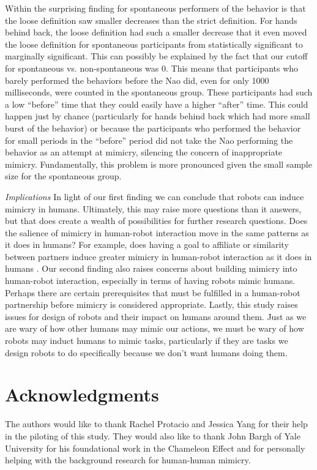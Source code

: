 \documentclass{acm_proc_article-sp}
\begin{document}
Within the surprising finding for spontaneous performers of the behavior is that the loose definition saw smaller decreases than the strict definition. For hands behind back, the loose definition had such a smaller decrease that it even moved the loose definition for spontaneous participants from statistically significant to marginally significant. This can possibly be explained by the fact that our cutoff for spontaneous vs. non-spontaneous was 0. This means that participants who barely performed the behaviors before the Nao did, even for only 1000 milliseconds, were counted in the spontaneous group. These participants had such a low ``before'' time that they could easily have a higher ``after'' time. This could happen just by chance (particularly for hands behind back which had more small burst of the behavior) or because the participants who performed the behavior for small periods in the ``before'' period did not take the Nao performing the behavior as an attempt at mimicry, silencing the concern of inappropriate mimicry. Fundamentally, this problem is more pronounced given the small sample size for the spontaneous group.

\textit{Implications}
In light of our first finding we can conclude that robots can induce mimicry in humans. Ultimately, this may raise more questions than it answers, but that does create a wealth of possibilities for further research questions. Does the salience of mimicry in human-robot interaction move in the same patterns as it does in humans? For example, does having a goal to affiliate or similarity between partners induce greater mimicry in human-robot interaction as it does in humans \cite{chartrand2013antecedents}. Our second finding also raises concerns about building mimicry into human-robot interaction, especially in terms of having robots mimic humans. Perhaps there are certain prerequisites that must be fulfilled in a human-robot partnership before mimicry is considered appropriate. Lastly, this study raises issues for design of robots and their impact on humans around them. Just as we are wary of how other humans may mimic our actions, we must be wary of how robots may induct humans to mimic tasks, particularly if they are tasks we design robots to do specifically because we don't want humans doing them.

\section{Acknowledgments}
The authors would like to thank Rachel Protacio and Jessica Yang for their help in the piloting of this study. They would also like to thank John Bargh of Yale University for his foundational work in the Chameleon Effect and for personally helping with the background research for human-human mimicry.

%

%
\end{document}
